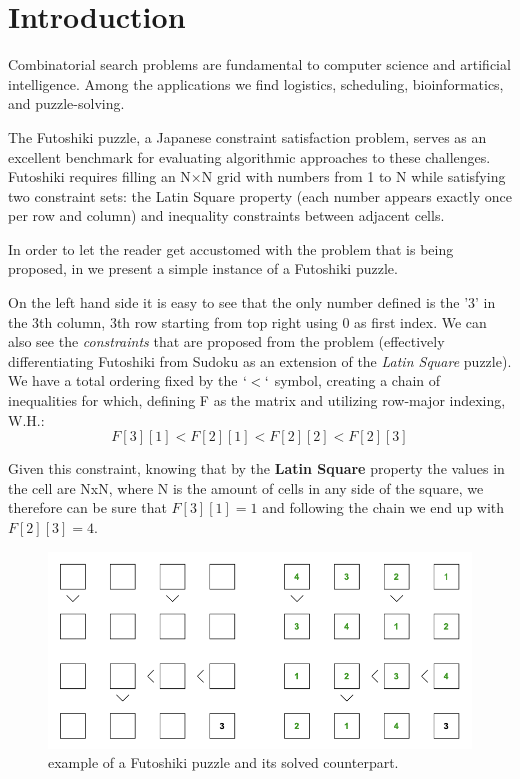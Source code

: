 \section{Introduction}
\label{sec:intro}
Combinatorial search problems are fundamental to computer science and artificial intelligence. Among the applications we find logistics, scheduling, bioinformatics, and puzzle-solving. 

The Futoshiki puzzle, a Japanese constraint satisfaction problem, serves as an excellent benchmark for evaluating algorithmic approaches to these challenges. Futoshiki requires filling an N×N grid with numbers from 1 to N while satisfying two constraint sets: the Latin Square property (each number appears exactly once per row and column) and inequality constraints between adjacent cells.

In order to let the reader get accustomed with the problem that is being proposed, in  we present a simple instance of a Futoshiki puzzle.

On the left hand side it is easy to see that the only number defined is the '3' in the 3th column, 3th row starting from top right using 0 as first index. We can also see the \textit{constraints} that are proposed from the problem (effectively differentiating Futoshiki from Sudoku as an extension of the \textit{Latin Square} puzzle). We have a total ordering fixed by the $`<`$ symbol, creating a chain of inequalities for which, defining F as the matrix and utilizing row-major indexing, W.H.:
\[
\label{futoshiki_inequalities}
    F[3][1] < F[2][1] < F[2][2] < F[2][3] 
\]

Given this constraint, knowing that by the \textbf{Latin Square} property the values in the cell are NxN, where N is the amount of cells in any side of the square, we therefore can be sure that $F[3][1] = 1$ and following the chain we end up with $F[2][3] = 4$.

\begin{figure}[H]
\centering
\includegraphics[scale=0.45]{imgs/futoshiki_example.png}
\caption{example of a Futoshiki puzzle and its solved counterpart. }
    \label{fig:futoshiki_example}
\end{figure}


